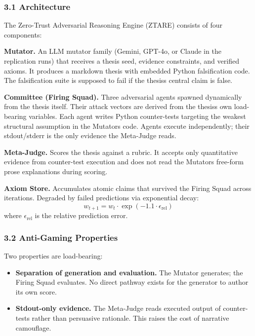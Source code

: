 \documentclass[
]{article}
\providecommand{\tightlist}{%
  \setlength{\itemsep}{0pt}\setlength{\parskip}{0pt}}
\begin{document}
\subsubsection{3.1 Architecture}\label{31-architecture}

The Zero-Trust Adversarial Reasoning Engine (ZTARE) consists of four
components:

\textbf{Mutator.} An LLM mutator family (Gemini, GPT-4o, or Claude in
the replication runs) that receives a thesis seed, evidence constraints,
and verified axioms. It produces a markdown thesis with embedded Python
falsification code. The falsification suite is supposed to fail if the
thesis\textquotesingle s central claim is false.

\textbf{Committee (Firing Squad).} Three adversarial agents spawned
dynamically from the thesis itself. Their attack vectors are derived
from the thesis\textquotesingle s own load-bearing variables. Each agent
writes Python counter-tests targeting the weakest structural assumption
in the Mutator\textquotesingle s code. Agents execute independently;
their stdout/stderr is the only evidence the Meta-Judge reads.

\textbf{Meta-Judge.} Scores the thesis against a rubric. It accepts only
quantitative evidence from counter-test execution and does not read the
Mutator\textquotesingle s free-form prose explanations during scoring.

\textbf{Axiom Store.} Accumulates atomic claims that survived the Firing
Squad across iterations. Degraded by failed predictions via exponential
decay:
\[
w_{t+1} = w_t \cdot \exp(-1.1 \cdot \epsilon_{\mathrm{rel}})
\]
where $\epsilon_{\mathrm{rel}}$ is the relative prediction error.

\subsubsection{3.2 Anti-Gaming
Properties}\label{32-anti-gaming-properties}

Two properties are load-bearing:

\begin{itemize}
\tightlist
\item
  \textbf{Separation of generation and evaluation.} The Mutator
  generates; the Firing Squad evaluates. No direct pathway exists for
  the generator to author its own score.
\item
  \textbf{Stdout-only evidence.} The Meta-Judge reads executed output of
  counter-tests rather than persuasive rationale. This raises the cost
  of narrative camouflage.
\end{itemize}
\end{document}
